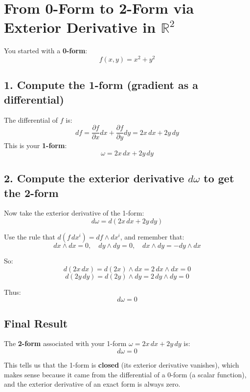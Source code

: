 \documentclass{article}
\begin{document}
	
	\section*{From 0-Form to 2-Form via Exterior Derivative in \(\mathbb{R}^2\)}
	
	You started with a \textbf{0-form}:
	\[
	f(x, y) = x^2 + y^2
	\]
	
	\subsection*{1. Compute the 1-form (gradient as a differential)}
	The differential of \( f \) is:
	\[
	df = \frac{\partial f}{\partial x} dx + \frac{\partial f}{\partial y} dy = 2x\,dx + 2y\,dy
	\]
	This is your \textbf{1-form}:
	\[
	\omega = 2x\,dx + 2y\,dy
	\]
	
	\subsection*{2. Compute the exterior derivative \( d\omega \) to get the 2-form}
	Now take the exterior derivative of the 1-form:
	\[
	d\omega = d(2x\,dx + 2y\,dy)
	\]
	
	Use the rule that \( d(f\,dx^i) = df \wedge dx^i \), and remember that:
	\[
	dx \wedge dx = 0, \quad dy \wedge dy = 0, \quad dx \wedge dy = -dy \wedge dx
	\]
	
	So:
	\[
	d(2x\,dx) = d(2x) \wedge dx = 2\,dx \wedge dx = 0
	\]
	\[
	d(2y\,dy) = d(2y) \wedge dy = 2\,dy \wedge dy = 0
	\]
	
	Thus:
	\[
	d\omega = 0
	\]
	
	\subsection*{Final Result}
	The \textbf{2-form} associated with your 1-form \( \omega = 2x\,dx + 2y\,dy \) is:
	\[
	d\omega = 0
	\]
	
	This tells us that the 1-form is \textbf{closed} (its exterior derivative vanishes), which makes sense because it came from the differential of a 0-form (a scalar function), and the exterior derivative of an exact form is always zero.
	
\end{document}

